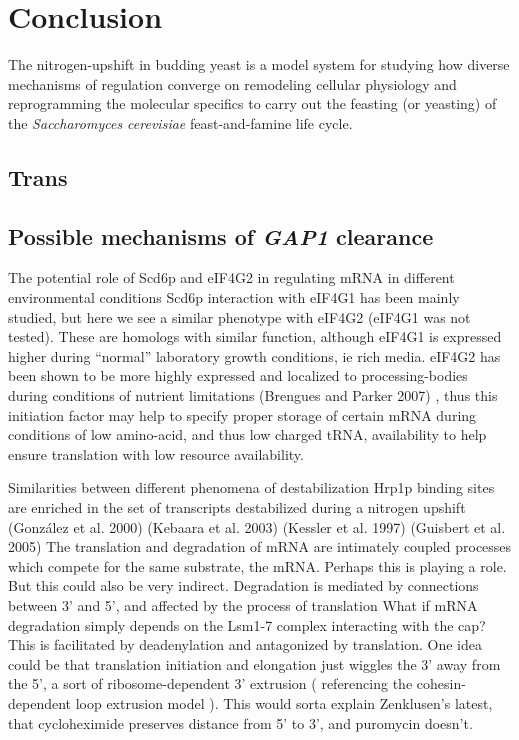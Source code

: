 \chapter{Conclusion}

The nitrogen-upshift in budding yeast is a model system for studying
how diverse mechanisms of regulation converge on remodeling cellular
physiology and reprogramming the molecular specifics to 
carry out the feasting (or yeasting) of the \textit{Saccharomyces
cerevisiae} feast-and-famine life cycle.

\section{Trans}

\section{Possible mechanisms of \textit{GAP1} clearance}

The potential role of Scd6p and eIF4G2 in
regulating mRNA in different environmental conditions Scd6p
interaction with eIF4G1 has been mainly studied, but here we see a
similar phenotype with eIF4G2 (eIF4G1 was not tested). These are
homologs with similar function, although eIF4G1 is expressed higher
during “normal” laboratory growth conditions, ie rich media. eIF4G2
has been shown to be more highly expressed and localized to
processing-bodies during conditions of nutrient limitations 
(Brengues and Parker 2007)
, thus this initiation factor may help to specify
proper storage of certain mRNA during conditions of low amino-acid,
and thus low charged tRNA, availability to help ensure translation
with low resource availability. 

Similarities between different
phenomena of destabilization Hrp1p binding sites are enriched in the
set of transcripts destabilized during a nitrogen upshift 
(González et al. 2000) (Kebaara et al. 2003) (Kessler et al. 1997) (Guisbert et al.
2005) 
The translation and degradation of mRNA are intimately coupled
processes which compete for the same substrate, the mRNA. Perhaps this
is playing a role. But this could also be very indirect.  Degradation
is mediated by connections between 3’ and 5’, and affected by the
process of translation What if mRNA degradation simply depends on the
Lsm1-7 complex interacting with the cap? This is facilitated by
deadenylation and antagonized by translation. One idea could be that
translation initiation and elongation just wiggles the 3’ away from
the 5’, a sort of ribosome-dependent 3’ extrusion ( referencing the
cohesin-dependent loop extrusion model ).  This would sorta explain
Zenklusen’s latest, that cycloheximide preserves distance from 5’ to
3’, and puromycin doesn’t.  

